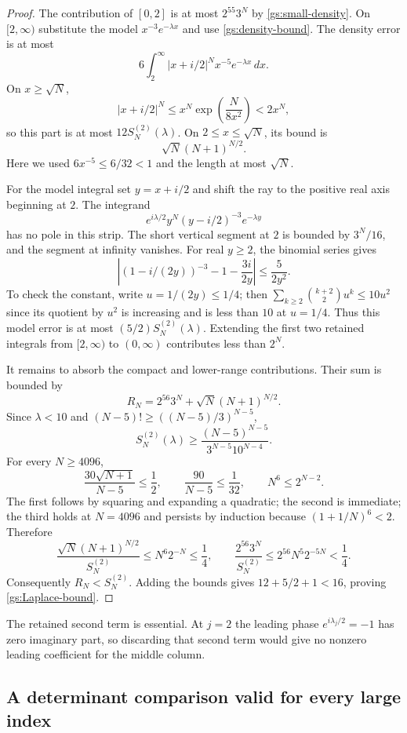 \documentclass[11pt,a4paper]{article}
\theoremstyle{definition}
\theoremstyle{remark}
\numberwithin{equation}{section}
\begin{document}
\begin{proof}
The contribution of $[0,2]$ is at most $2^{55}3^N$ by
\eqref{gs:small-density}.  On $[2,\infty)$ substitute the model
$x^{-3}e^{-\lambda x}$ and use \eqref{gs:density-bound}.
The density error is at most
\[
 6\int_2^\infty|x+i/2|^Nx^{-5}e^{-\lambda x}\,dx.
\]
On $x\ge\sqrt N$,
\[
 |x+i/2|^N\le x^N\exp\left(\frac{N}{8x^2}\right)<2x^N,
\]
so this part is at most $12S_N^{(2)}(\lambda)$.  On
$2\le x\le\sqrt N$, its bound is
\[
                       \sqrt N(N+1)^{N/2}.
\]
Here we used $6x^{-5}\le6/32<1$ and the length at most $\sqrt N$.

For the model integral set $y=x+i/2$ and shift the ray to the
positive real axis beginning at $2$.  The integrand
\[
       e^{i\lambda/2}y^N(y-i/2)^{-3}e^{-\lambda y}
\]
has no pole in this strip.  The short vertical segment at $2$
is bounded by $3^N/16$, and the segment at infinity vanishes.
For real $y\ge2$, the binomial series gives
\[
 \left|(1-i/(2y))^{-3}-1-\frac{3i}{2y}\right|
                  \le\frac5{2y^2}.
\]
To check the constant, write $u=1/(2y)\le1/4$; then
$\sum_{k\ge2}\binom{k+2}{2}u^k\le10u^2$ since its quotient
by $u^2$ is increasing and is less than $10$ at $u=1/4$.
Thus this model error is at most $(5/2)S_N^{(2)}(\lambda)$.
Extending the first two retained integrals from $[2,\infty)$
to $(0,\infty)$ contributes less than $2^N$.

It remains to absorb the compact and lower-range contributions.
Their sum is bounded by
\[
 R_N=2^{56}3^N+\sqrt N(N+1)^{N/2}.
\]
Since $\lambda<10$ and $(N-5)!\ge((N-5)/3)^{N-5}$,
\[
 S_N^{(2)}(\lambda)
 \ge\frac{(N-5)^{N-5}}{3^{N-5}10^{N-4}}.
\]
For every $N\ge4096$,
\[
 \frac{30\sqrt{N+1}}{N-5}\le\frac12,
 \qquad \frac{90}{N-5}\le\frac1{32},
 \qquad N^6\le2^{N-2}.
\]
The first follows by squaring and expanding a quadratic; the second
is immediate; the third holds at $N=4096$ and persists by induction
because $(1+1/N)^6<2$.  Therefore
\[
 \frac{\sqrt N(N+1)^{N/2}}{S_N^{(2)}}
       \le N^6 2^{-N}\le\frac14,
 \qquad
 \frac{2^{56}3^N}{S_N^{(2)}}
       \le2^{56}N^5 2^{-5N}<\frac14.
\]
Consequently $R_N<S_N^{(2)}$.  Adding the bounds gives
$12+5/2+1<16$, proving \eqref{gs:Laplace-bound}.
\end{proof}

The retained second term is essential.  At $j=2$ the leading
phase $e^{i\lambda_j/2}=-1$ has zero imaginary part, so discarding
that second term would give no nonzero leading coefficient for the
middle column.

\subsection{A determinant comparison valid for every large index}
\end{document}
